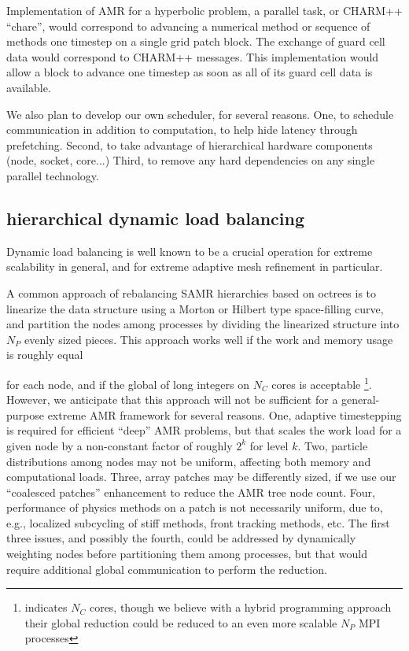 \documentclass[14pt,letter]{article}
\begin{document}
Implementation of AMR for a hyperbolic problem, a parallel task, or
CHARM++ ``chare'', would correspond to advancing a numerical method or
sequence of methods one timestep on a single grid patch block.  The
exchange of guard cell data would correspond to CHARM++ messages.
This implementation would allow a block to advance one timestep as
soon as all of its guard cell data is available.


We also plan to develop our own scheduler, for several reasons.  One,
to schedule communication in addition to computation, to help hide
latency through prefetching.  Second, to take advantage of
hierarchical hardware components (node, socket, core...)  Third, to
remove any hard dependencies on any single parallel technology.

\subsection{hierarchical dynamic load balancing}

Dynamic load balancing is well known to be a crucial operation for
extreme scalability in general, and for extreme adaptive mesh
refinement in particular.

A common approach of rebalancing SAMR hierarchies based on octrees is
to linearize the data structure using a Morton or Hilbert type
space-filling curve, and partition the nodes among processes by
dividing the linearized structure into $N_P$ evenly sized pieces.
This approach works well if the work and memory usage is roughly equal

for each node, and if the global  of long
integers on $N_C$ cores is acceptable \footnote{\cite{BuGh08}
  indicates $N_C$ cores, though we believe with a hybrid programming
  approach their global reduction could be reduced to an even more
  scalable $N_P$ MPI processes}.  However, we anticipate that this
approach will not be sufficient for a general-purpose extreme AMR
framework for several reasons.
%
One, adaptive timestepping is required for efficient ``deep'' AMR
problems, but that scales the work load for a given node by a
non-constant factor of roughly $2^k$ for level $k$.
%
Two, particle distributions among nodes may not be uniform, affecting both memory and computational loads.
%
Three, array patches may be differently sized, if we use our ``coalesced patches'' enhancement to reduce the AMR tree node count.  
%
Four, performance of physics methods on a patch is not necessarily
uniform, due to, e.g., localized subcycling of stiff methods, front
tracking methods, etc.  The first three issues, and possibly the
fourth, could be addressed by dynamically weighting nodes before
partitioning them among processes, but that would require additional
global communication to perform the reduction.
%
\end{document}
